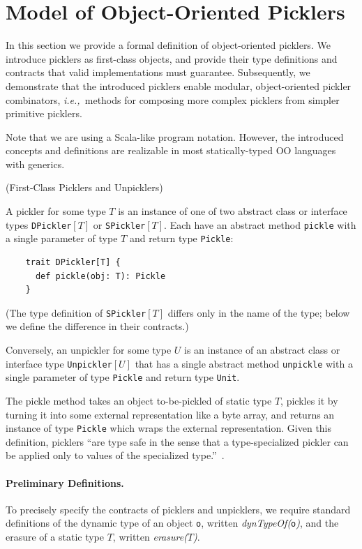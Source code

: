 \documentclass[preprint,10pt]{sigplanconf}
\theoremstyle{definition}
\theoremstyle{definition}
\newcommand{\ie}{{\em i.e.,~}}
\newcommand{\term}[1]{\mbox{\texttt{#1}}}
\newcommand{\itl}[1]{\mbox{\textit{#1}}}
\begin{document}
\section{Model of Object-Oriented Picklers}
\label{sec:oopicklers}

In this section we provide a formal definition of object-oriented picklers. We
introduce picklers as first-class objects, and provide their type definitions
and contracts that valid implementations must guarantee. Subsequently, we
demonstrate that the introduced picklers enable modular, object-oriented
pickler combinators, \ie methods for composing more complex picklers from
simpler primitive picklers.

Note that we are using a Scala-like program notation. However, the introduced
concepts and definitions are realizable in most statically-typed OO languages
with generics.

\begin{defn}(First-Class Picklers and Unpicklers)

A pickler for some type $T$ is an instance of one of two abstract class or
interface types \term{DPickler}$[T]$ or \term{SPickler}$[T]$. Each have an
abstract method \verb|pickle| with a single parameter of type $T$ and return
type \term{Pickle}:

\begin{lstlisting}
    trait DPickler[T] {
      def pickle(obj: T): Pickle
    }
\end{lstlisting}

\noindent(The type definition of \term{SPickler}$[T]$ differs only in the name of the type;
below we define the difference in their contracts.)

Conversely, an unpickler for some type $U$ is an instance of an abstract class
or interface type \term{Unpickler}$[U]$ that has a single abstract method
\verb|unpickle| with a single parameter of type \term{Pickle} and return type
\term{Unit}.
\end{defn}

The pickle method takes an object to-be-pickled of static type $T$, pickles it
by turning it into some external representation like a byte array, and returns
an instance of type \term{Pickle} which wraps the external representation. Given this
definition, picklers ``are type safe in the sense that a type-specialized
pickler can be applied only to values of the specialized type.''~\cite{Elsman2005}.

\paragraph{Preliminary Definitions.} To precisely specify the contracts of
picklers and unpicklers, we require standard definitions of the dynamic type
of an object \term{o}, written \itl{dynTypeOf(}\term{o}\itl{)}, and the erasure of a
static type $T$, written \itl{erasure(}$T$\itl{)}.
\end{document}
